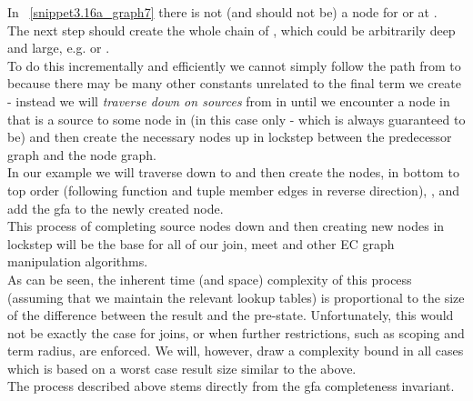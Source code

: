 In ~\ref{snippet3.16a_graph7} there is not (and should not be) a node for  or  at .\\
The next step should create the whole chain of , which could be arbitrarily deep and large, e.g.  or .\\
To do this incrementally and efficiently we cannot simply follow the path from \s{()} to  because there may be many other constants unrelated to the final term we create - instead we will \emph{traverse down on sources} from  in  until we encounter a node in  that is a source to some node in  (in this case only \s{()} - which is always guaranteed to be) 
and then create the necessary nodes up in lockstep between the predecessor graph and the node graph.\\
In our example we will traverse down to \s{()} and then create the nodes, in bottom to top order (following function and tuple member edges in reverse direction), , and add the gfa  to the newly created node. \\
This process of completing source nodes down and then creating new nodes in lockstep will be the base for all of our join, meet and other EC graph manipulation algorithms.\\
As can be seen, the inherent time (and space) complexity of this process (assuming that we maintain the relevant lookup tables) is proportional to the size of the difference between the result and the pre-state. Unfortunately, this would not be exactly the case for joins, or when further restrictions, such as scoping and term radius, are enforced. We will, however, draw a complexity bound in all cases which is based on a worst case result size similar to the above.\\
The process described above stems directly from the gfa completeness invariant.

